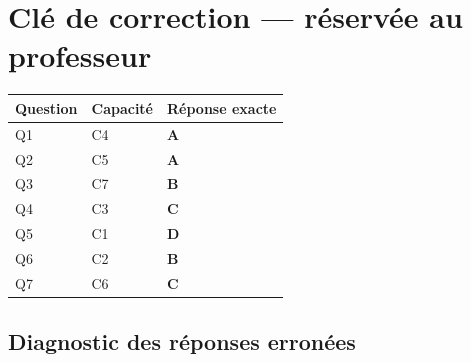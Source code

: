 \ifnxVersionProfesseur
\clearpage
\section*{Clé de correction — réservée au professeur}

\begin{center}
\begin{tabular}{lll}
\hline
Question & Capacité & Réponse exacte \\
\hline
Q1 & C4 & \textbf{A} \\
Q2 & C5 & \textbf{A} \\
Q3 & C7 & \textbf{B} \\
Q4 & C3 & \textbf{C} \\
Q5 & C1 & \textbf{D} \\
Q6 & C2 & \textbf{B} \\
Q7 & C6 & \textbf{C} \\
\hline
\end{tabular}
\end{center}

\subsection*{Diagnostic des réponses erronées}


